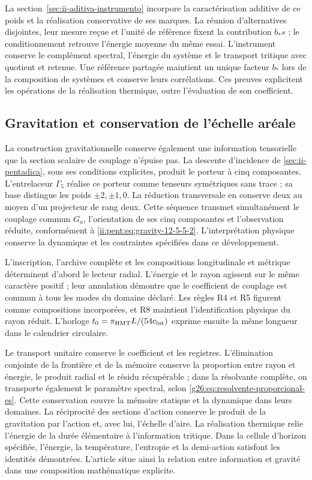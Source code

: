 La section~\ref{sec:ii-aditiva-instrumento} incorpore la caractérisation
additive de ce poids et la réalisation conservative de ses marques.
La réunion d’alternatives disjointes, leur mesure reçue et l’unité de
référence fixent la contribution $b_*s$ ; le conditionnement retrouve
l’énergie moyenne du même essai. L’instrument conserve le complément
spectral, l’énergie du système et le transport tritique avec quotient et retenue.
Une référence partagée maintient un unique facteur $b_*$ lors de la composition de
systèmes et conserve leurs corrélations. Ces preuves explicitent les
opérations de la réalisation thermique, outre l’évaluation de son coefficient.

\subsection{Gravitation et conservation de l'échelle aréale}

La construction gravitationnelle conserve également une information tensorielle
que la section scalaire de couplage n’épuise pas. La descente d’incidence
de \ref{sec:ii-pentadica}, sous ses conditions explicites, produit le
porteur à cinq composantes. L’entrelaceur \(\Gamma_5\) réalise ce
porteur comme tenseurs symétriques sans trace ; sa base distingue les poids
\(\pm2,\pm1,0\). La réduction transversale en conserve deux au moyen
d’un projecteur de rang deux. Cette séquence transmet simultanément le
couplage commun \(G_a\), l’orientation de ses cinq composantes et
l’observation réduite, conformément à
\eqref{ii:pent:eq:gravity-12-5-5-2}. L’interprétation physique conserve la
dynamique et les contraintes spécifiées dans ce développement.

L’inscription, l’archive complète et les compositions longitudinale
et métrique déterminent d’abord le lecteur radial. L’énergie et le rayon
agissent sur le même caractère positif ; leur annulation démontre que
le coefficient de couplage est commun à tous les modes du domaine
déclaré. Les règles R4 et R5 figurent comme compositions incorporées,
et R8 maintient l’identification physique du rayon réduit. L’horloge
\(t_0=\pi_{\mathrm{HMT}}L/(54c_{\rm int})\) exprime ensuite la
même longueur dans le calendrier circulaire.

Le transport unitaire conserve le coefficient et les registres.
L’élimination conjointe de la frontière et de la mémoire conserve la proportion
entre rayon et énergie, le produit radial et le résidu récupérable ;
dans la résolvante complète, on transporte également le paramètre spectral,
selon \eqref{g26:eq:resolvente-proporcional-es}. Cette conservation
couvre la mémoire statique et la dynamique dans leurs domaines.
La réciprocité des sections d’action conserve le
produit de la gravitation par l’action et, avec lui, l’échelle d’aire. La
réalisation thermique relie l’énergie de la durée élémentaire à
l’information tritique. Dans la cellule d’horizon spécifiée, l’énergie,
la température, l’entropie et la demi-action satisfont les identités
démontrées. L’article situe ainsi la relation entre information et
gravité dans une composition mathématique explicite.


